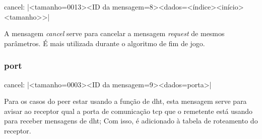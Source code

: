 cancel: \bverb|<tamanho=0013><ID da mensagem=8><dados=<índice><início><tamanho>>|

A mensagem \emph{cancel} serve para cancelar a mensagem \emph{request} de mesmos
parâmetros. É mais utilizada durante o algoritmo de fim de jogo.


\subsubsection*{port}

cancel: \bverb|<tamanho=0003><ID da mensagem=9><dados=porta>|

Para os casos do \gls*{peer} estar usando a função de \gls*{dht}, esta mensagem serve
para avisar ao receptor qual a porta de comunicação \gls*{tcp} que o remetente está
usando para receber mensagens de \gls*{dht}; Com isso, é adicionado à tabela de
roteamento do receptor.